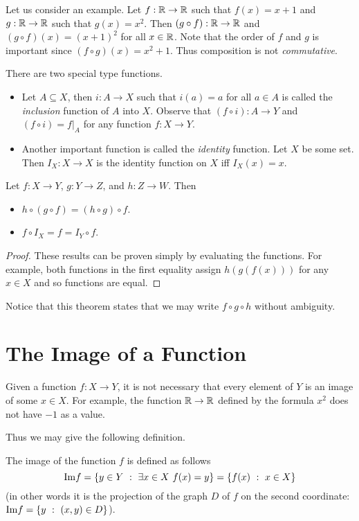 Let us consider an example. Let $f : \mathbb{R} \to \mathbb{R}$ such that $f(x) = x + 1$ and
$g : \mathbb{R} \to \mathbb{R}$ such that $g(x) = x^2$. Then $(g \circ f) : \mathbb{R} \to \mathbb{R}$ and
$(g \circ f)(x) = (x + 1)^2$ for all $x \in \mathbb{R}$. Note that the order of $f$ and
$g$ is important since $(f \circ g)(x) = x^2 + 1$. Thus composition is not
\emph{commutative}.

There are two special type functions.
\begin{itemize}
  \item Let $A \subseteq X$, then $i : A \to X$ such that $i(a) = a$ for all
    $a \in A$ is called the \emph{inclusion} function of $A$ into $X$. Observe
    that $(f \circ i) : A \to Y$ and $(f \circ i) = f|_A$
    for any function $f : X \to Y$.
  \item Another important function is called the \emph{identity} function.
    Let $X$ be some set. Then $I_X : X \to X$ is the identity function on $X$
    iff $I_X(x) = x$.
\end{itemize}

\begin{theorem}
  Let $f : X \to Y$, $g : Y \to Z$, and $h : Z \to W$. Then
  \begin{itemize}
    \item $h \circ (g \circ f) = (h \circ g) \circ f$.
    \item $f \circ I_X = f = I_Y \circ f$.
  \end{itemize}
\end{theorem}
\begin{proof}
  These results can be proven simply by evaluating the functions. For example,
  both functions in the first equality assign $h(g(f(x)))$ for any $x \in X$
  and so functions are equal.
\end{proof}
Notice that this theorem states that we may write $f \circ g \circ h$ without
ambiguity.

\section{The Image of a Function}
Given a function $f : X \to Y$, it is not necessary that every element of $Y$
is an image of some $x \in X$. For example, the function $\mathbb{R} \to \mathbb{R}$ defined by
the formula $x^2$ does not have $-1$ as a value.

Thus we may give the following definition.
\begin{definition}
  The image of the function $f$ is defined as follows
  \[
    \Im f = \set[\exists x \in X\ f(x) = y]{y \in Y}
    = \set[x \in X]{f(x)}
  \]
  (in other words it is the projection of the graph $D$ of $f$ on the second
  coordinate: $\Im f = \set[(x, y) \in D]{y}$).
\end{definition}


